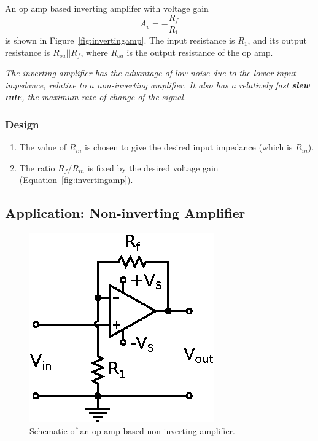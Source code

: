 \documentclass[11pt]{article}
\begin{document}
An op amp based inverting amplifer with voltage gain
\begin{equation}
  A_v = -\frac{R_f}{R_1}
  \label{eq:invampgain}
\end{equation}
is shown in Figure~\ref{fig:invertingamp}. The input resistance is
$R_1$, and its output resistance is $R_{oa}||R_f$, where $R_{oa}$ is
the output resistance of the op amp.

\emph{The inverting amplifier has the advantage of low noise due to
  the lower input impedance, relative to a non-inverting amplifier. It
  also has a relatively fast \textbf{slew rate}, the maximum rate of
  change of the signal.}

\subsubsection*{Design}
\begin{enumerate}
\item The value of $R_{in}$ is chosen to give the desired input
  impedance (which is $R_{in}$).

\item The ratio $R_f/R_{in}$ is fixed by the desired voltage gain
  (Equation~\ref{fig:invertingamp}).
\end{enumerate}

\subsection{Application: Non-inverting Amplifier}
\label{sec:noninvertingamp}

\begin{figure}[ht]
  \begin{center}
    \includegraphics{noninvertingamp.eps}
    \caption{Schematic of an op amp based non-inverting amplifier.}
    \label{fig:noninvertingamp}
  \end{center}
\end{figure}
\end{document}
